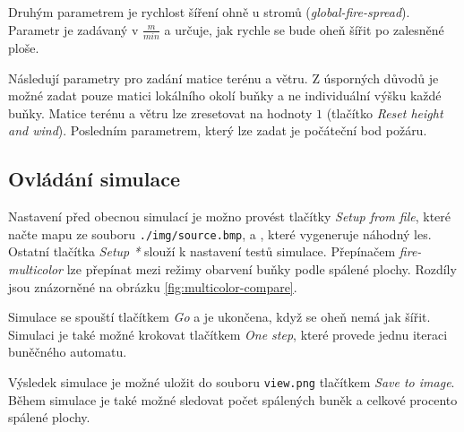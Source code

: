 \documentclass[11pt,a4paper]{scrartcl}
\begin{document}
	Druhým parametrem je rychlost šíření ohně u stromů (\textit{global-fire-spread}). Parametr je zadávaný v $\frac{m}{min}$ a určuje, jak rychle se bude oheň šířit po zalesněné ploše.
	
	Následují parametry pro zadání matice terénu a větru. Z úsporných důvodů je možné zadat pouze matici lokálního okolí buňky a ne individuální výšku každé buňky. Matice terénu a větru lze zresetovat na hodnoty $1$ (tlačítko \textit{Reset height and wind}). Posledním parametrem, který lze zadat je počáteční bod požáru.

	\subsection{Ovládání simulace}
	Nastavení před obecnou simulací je možno provést tlačítky \textit{Setup from file}, které načte mapu ze souboru \verb|./img/source.bmp|, a , které vygeneruje náhodný les. Ostatní tlačítka \textit{Setup *} slouží k nastavení testů simulace. Přepínačem \textit{fire-multicolor} lze přepínat mezi režimy obarvení buňky podle spálené plochy. Rozdíly jsou znázorněné na obrázku \ref{fig:multicolor-compare}.
	
	Simulace se spouští tlačítkem \textit{Go} a je ukončena, když se oheň nemá jak šířit. Simulaci je také možné krokovat tlačítkem \textit{One step}, které provede jednu iteraci buněčného automatu.
	
	Výsledek simulace je možné uložit do souboru \verb|view.png| tlačítkem \textit{Save to image}. Během simulace je také možné sledovat počet spálených buněk a celkové procento spálené plochy.
	
\end{document}

